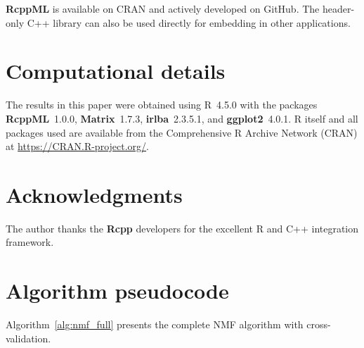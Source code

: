 \documentclass[11pt]{article}
\newcommand{\proglang}[1]{\textsf{#1}}
\newcommand{\pkg}[1]{\textbf{#1}}
\begin{document}
\pkg{RcppML} is available on CRAN and actively developed on GitHub. The 
header-only \proglang{C++} library can also be used directly for embedding in 
other applications.



\section*{Computational details}

The results in this paper were obtained using \proglang{R}~4.5.0 with the 
packages \pkg{RcppML}~1.0.0, \pkg{Matrix}~1.7.3, \pkg{irlba}~2.3.5.1, and 
\pkg{ggplot2}~4.0.1. \proglang{R} itself and all packages used are available 
from the Comprehensive \proglang{R} Archive Network (CRAN) at 
\url{https://CRAN.R-project.org/}.



\section*{Acknowledgments}

The author thanks the \pkg{Rcpp} developers for the excellent \proglang{R} and 
\proglang{C++} integration framework.








\appendix

\section{Algorithm pseudocode} \label{app:pseudocode}

Algorithm~\ref{alg:nmf_full} presents the complete NMF algorithm with 
cross-validation.
\end{document}
